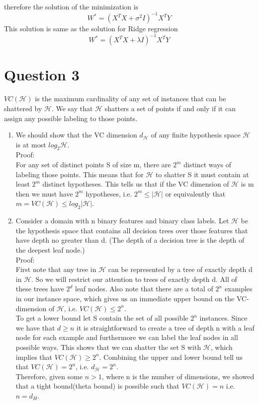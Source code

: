 \documentclass{article}
\begin{document}
therefore the solution of the minimization is 
\begin{equation*}
		W^* = (X^TX + \sigma^2I)^{-1}X^TY
\end{equation*}
This solution is same as the solution for Ridge regression
\begin{equation*}
	W^* = (X^TX  + \lambda I)^{-1}X^TY
\end{equation*}

\section*{Question 3}

$VC(\mathcal{H})$ is the maximum cardinality of any set of instances that can be shattered by $\mathcal{H}$. We say that $\mathcal{H}$ shatters a set of points if and only if it can assign any possible labeling to those points.
\begin{enumerate}
    \item We should show that the VC dimension $d_\mathcal{H}$ of any finite hypothesis space $\mathcal{H}$ is at most $log_{2}\mathcal{H}$.
\\Proof:
\\For any set of distinct points S of size m, there are $2^m$ distinct ways of labeling those points. This means that for $\mathcal{H}$ to shatter S it must contain at least $2^m$ distinct hypotheses. This tells us that if the VC dimension of $\mathcal{H}$ is m then we must have $2^m$ hypotheses, i.e. $2^m \leq |\mathcal{H}| $ or equivalently that $m = VC(\mathcal{H}) \leq log_{2}|\mathcal{H}|$.
    \item Consider a domain with n binary features and binary class labels. Let $\mathcal{H}$ be the hypothesis space that contains all decision trees over those features that have depth no greater than d. (The depth of a decision tree is the depth of the deepest leaf node.)
\\Proof: 
\\First note that any tree in $\mathcal{H}$ can be represented by a tree of exactly depth d in $\mathcal{H}$. So we will restrict our attention to trees of exactly depth d. All of these trees have $2^d$ leaf nodes. Also note that there are a total of $2^n$ examples in our instance space, which gives us an immediate upper bound on the VC-dimension of $\mathcal{H}$, i.e. $VC(\mathcal{H}) \leq 2^n$.
\\To get a lower bound let S contain the set of all possible $2^n$
instances. Since we have that $d \geq n$ it is straightforward to create a tree of depth n with a leaf node for each example and furthermore we can label the leaf nodes in all possible ways. This shows that we can shatter the set S with $\mathcal{H}$, which implies that $VC(\mathcal{H}) \geq 2^n$. Combining the upper and lower bound tell us that $VC(\mathcal{H}) = 2^n$, i.e. $d_\mathcal{H} = 2^n$.
\\Therefore, given some $n > 1$, where n is the number of dimensions, we showed that a tight bound(theta bound) is possible such that $VC(\mathcal{H}) = n$ i.e. $n = d_H$.


\end{enumerate}
\end{document}
